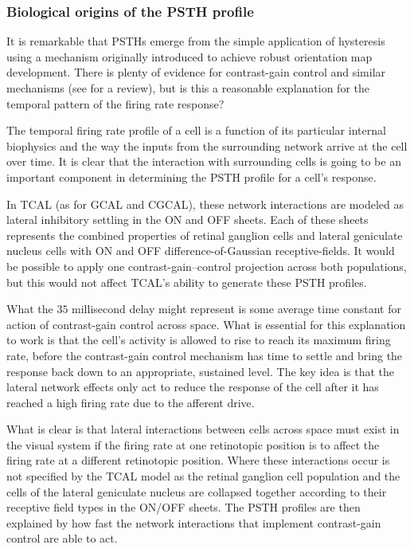 \documentclass[phd,ianc,twoside]{infthesis}
\begin{document}
\subsubsection*{Biological origins of the PSTH profile}

It is remarkable that PSTHs emerge from the simple application of
hysteresis using a mechanism originally introduced to achieve robust
orientation map development. There is plenty of evidence for
contrast-gain control and similar mechanisms (see
\citealt{carandini_nature12} for a review), but is this a reasonable
explanation for the temporal pattern of the firing rate response?

The temporal firing rate profile of a cell is a function of its
particular internal biophysics and the way the inputs from the
surrounding network arrive at the cell over time. It is clear that the
interaction with surrounding cells is going to be an important
component in determining the PSTH profile for a cell's response.

In TCAL (as for GCAL and CGCAL), these network interactions are
modeled as lateral inhibitory
settling in the ON and OFF sheets. Each of these sheets represents the
combined properties of retinal ganglion cells and lateral geniculate
nucleus cells with ON and OFF difference-of-Gaussian
receptive-fields. It would be possible to apply one contrast-gain--control
projection across both populations, but this would not affect TCAL's
ability to generate these PSTH profiles. 

What the $35$ millisecond delay might represent is some average time
constant for action of contrast-gain control across space. What is
essential for this explanation to work is that the cell's activity is
allowed to rise to reach its maximum firing rate, before the
contrast-gain control mechanism has time to settle and bring the
response back down to an appropriate, sustained level. The key idea is
that the lateral network effects only act to reduce the response of the cell
after it has reached a high firing rate due to the afferent drive.

What is clear is that lateral interactions between cells across space
must exist in the visual system if the firing rate at one retinotopic
position is to affect the firing rate at a different retinotopic
position. Where these interactions occur is not specified by the TCAL
model as the retinal ganglion cell population and the cells of the
lateral geniculate nucleus are collapsed together according to their
receptive field types in the ON/OFF sheets. The PSTH profiles are then
explained by how fast the network interactions that implement
contrast-gain control are able to act.
\end{document}
